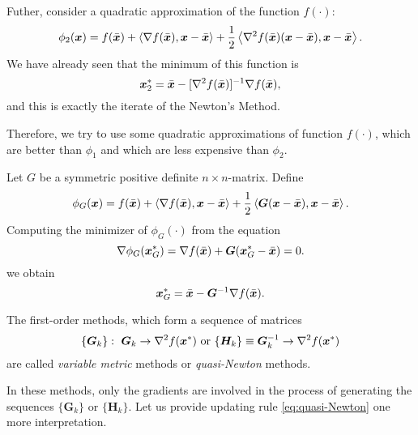 Futher, consider a quadratic approximation of the function \(f(\cdot)\):
\[
    \phi_2(\xB) = f(\bar{\xB}) + \innerprod{\grad f(\bar{\xB})}{\xB - \bar{\xB}} + \frac{1}{2}\innerprod{\hess f(\bar{\xB})(\xB - \bar{\xB})}{\xB - \bar{\xB}}.  
\] 
We have already seen that the minimum of this function is
\[
    \xB^*_2 = \bar{\xB} - [\hess f(\bar{\xB})]^{-1}\grad f(\bar{\xB}),  
\]
and this is exactly the iterate of the Newton's Method.

Therefore, we try to use some quadratic approximations of function \(f(\cdot)\), which are better than \(\phi_1\) and which are less expensive than \(\phi_2\).

Let \(G\) be a symmetric positive definite \(n \times n\)-matrix. Define 
\[
    \phi_G(\bm{x}) = f(\bar{\bm{x}}) + \left\langle \nabla f(\bar{\bm{x}}), \bm{x} - \bar{\bm{x}} \right\rangle + \frac{1}{2} \left\langle \bm{G}(\bm{x} - \bar{\bm{x}}), \bm{x} - \bar{\bm{x}} \right\rangle. 
\]
Computing the minimizer of \(\phi_G(\cdot)\) from the equation
\[
    \nabla \phi_G(\bm{x}_G^*) = \nabla f(\bar{\bm{x}}) + \bm{G}(\bm{x}_G^* - \bar{\bm{x}}) = 0.  
\] 
we obtain
\begin{equation}\label{eq:quasi-Newton}
    \bm{x}_G^* = \bar{\bm{x}} - \bm{G}^{-1} \nabla f(\bar{\bm{x}}).  
\end{equation}

\begin{defn}
    The first-order methods, which form a sequence of matrices
    \[
        \{\bm{G}_k\}:~\bm{G}_k \to \hess f(\xB^*) ~\text{or}~ \{\bm{H}_k\} \equiv \bm{G}_k^{-1} \to \hess f(\xB^*)
    \]
    are called \emph{variable metric} methods or \emph{quasi-Newton} methods.
\end{defn}
In these methods, only the gradients are involved in the process of generating the sequences \(\{\bm{G}_k\}\) or \(\{\bm{H}_k\}\).
Let us provide updating rule \ref{eq:quasi-Newton} one more interpretation.

